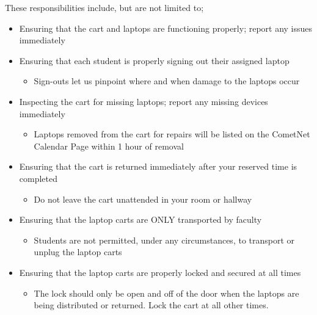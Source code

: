 \begin{titlepage}
\small 
These responsibilities include, but are not limited to;
\begin{itemize}
\item Ensuring that the cart and laptops are functioning properly; report any issues immediately
\item Ensuring that each student is properly signing out their assigned laptop
\begin{itemize}
\item Sign-outs let us pinpoint where and when damage to the laptops occur
\end{itemize}
\item Inspecting the cart for missing laptops; report any missing devices immediately
\begin{itemize}
\item Laptops removed from the cart for repairs will be listed on the CometNet Calendar Page within 1 hour of removal
\end{itemize}
\item Ensuring that the cart is returned immediately after your reserved time is completed
\begin{itemize}
\item Do not leave the cart unattended in your room or hallway
\end{itemize}
\item Ensuring that the laptop carts are ONLY transported by faculty
\begin{itemize}
\item Students are not permitted, under any circumstances, to transport or unplug the laptop carts
\end{itemize}
\item Ensuring that the laptop carts are properly locked and secured at all times
\begin{itemize}
\item The lock should only be open and off of the door when the laptops are being distributed or returned. Lock the cart at all other times. 
\end{itemize}
\end{itemize}
\end{titlepage}
